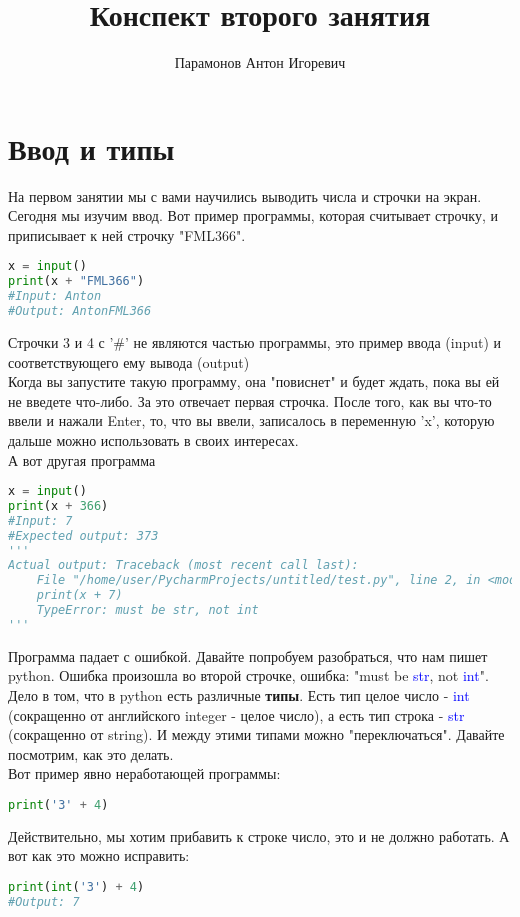 \documentclass[12pt]{article} %
\begin{document}
\title{Конспект второго занятия}
\author{Парамонов Антон Игоревич}
\maketitle
\section{Ввод и типы}
На первом занятии мы с вами научились выводить числа и строчки на экран. Сегодня мы изучим ввод. Вот пример программы, которая считывает строчку, и приписывает к ней строчку "FML366".
\begin{lstlisting}[language=Python]
x = input()
print(x + "FML366")
#Input: Anton
#Output: AntonFML366 
\end{lstlisting}
Строчки 3 и 4 с '\#' не являются частью программы, это пример ввода (input) и соответствующего ему вывода (output)\\
Когда вы запустите такую программу, она "повиснет" и будет ждать, пока вы ей не введете что-либо. За это отвечает первая строчка. После того, как вы что-то ввели и нажали Enter, то, что вы ввели, записалось в переменную 'x', которую дальше можно использовать в своих интересах.\\
А вот другая программа
\begin{lstlisting}[language=Python]
x = input()
print(x + 366)
#Input: 7
#Expected output: 373
'''
Actual output: Traceback (most recent call last):
	File "/home/user/PycharmProjects/untitled/test.py", line 2, in <module>
	print(x + 7)
	TypeError: must be str, not int
'''
\end{lstlisting}
Программа падает с ошибкой. Давайте попробуем разобраться, что нам пишет python. Ошибка произошла во второй строчке, ошибка: "must be \textcolor{blue}{str}, not \textcolor{blue}{int}". \\
Дело в том, что в python есть различные \textbf{типы}. Есть тип целое число - \textcolor{blue}{int} (сокращенно от английского integer - целое число), а есть тип строка - \textcolor{blue}{str} (сокращенно от string). И между этими типами можно "переключаться". Давайте посмотрим, как это делать.\\
Вот пример явно неработающей программы:
\begin{lstlisting}[language=Python]
print('3' + 4)
\end{lstlisting}
Действительно, мы хотим прибавить к строке число, это и не должно работать. А вот как это можно исправить:
\begin{lstlisting}[language=Python]
print(int('3') + 4)
#Output: 7
\end{lstlisting}
\end{document}
